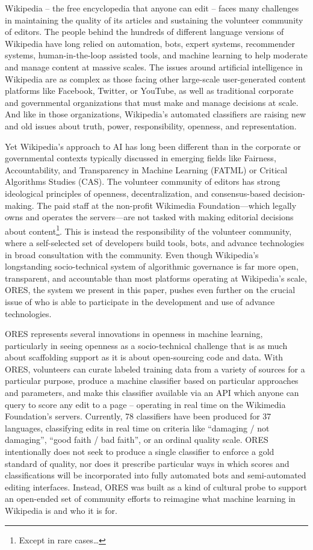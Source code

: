 Wikipedia -- the free encyclopedia that anyone can edit -- faces many challenges in maintaining the quality of its articles and sustaining the volunteer community of editors. The people behind the hundreds of different language versions of Wikipedia have long relied on automation, bots, expert systems, recommender systems, human-in-the-loop assisted tools, and machine learning to help moderate and manage content at massive scales. The issues around artificial intelligence in Wikipedia are as complex as those facing other large-scale user-generated content platforms like Facebook, Twitter, or YouTube, as well as traditional corporate and governmental organizations that must make and manage decisions at scale. And like in those organizations, Wikipedia’s automated classifiers are raising new and old issues about truth, power, responsibility, openness, and representation.

Yet Wikipedia's approach to AI has long been different than in the corporate or governmental contexts typically discussed in emerging fields like Fairness, Accountability, and Transparency in Machine Learning (FATML) or Critical Algorithms Studies (CAS). The volunteer community of editors has strong ideological principles of openness, decentralization, and consensus-based decision-making. The paid staff at the non-profit Wikimedia Foundation---which legally owns and operates the servers---are not tasked with making editorial decisions about content\footnote{Except in rare cases…}. This is instead the responsibility of the volunteer community, where a self-selected set of developers build tools, bots, and advance technologies in broad consultation with the community. Even though Wikipedia's longstanding socio-technical system of algorithmic governance is far more open, transparent, and accountable than most platforms operating at Wikipedia's scale, ORES, the system we present in this paper, pushes even further on the crucial issue of who is able to participate in the development and use of advance technologies.

ORES represents several innovations in openness in machine learning, particularly in seeing openness as a socio-technical challenge that is as much about scaffolding support as it is about open-sourcing code and data. With ORES, volunteers can curate labeled training data from a variety of sources for a particular purpose, produce a machine classifier based on particular approaches and parameters, and make this classifier available via an API which anyone can query to score any edit to a page -- operating in real time on the Wikimedia Foundation's servers. Currently, 78 classifiers have been produced for 37 languages, classifying edits in real time on criteria like ``damaging / not damaging'', ``good faith / bad faith'', or an ordinal quality scale. ORES intentionally does not seek to produce a single classifier to enforce a gold standard of quality, nor does it prescribe particular ways in which scores and classifications will be incorporated into fully automated bots and semi-automated editing interfaces. Instead, ORES was built as a kind of cultural probe to support an open-ended set of community efforts to reimagine what machine learning in Wikipedia is and who it is for.

